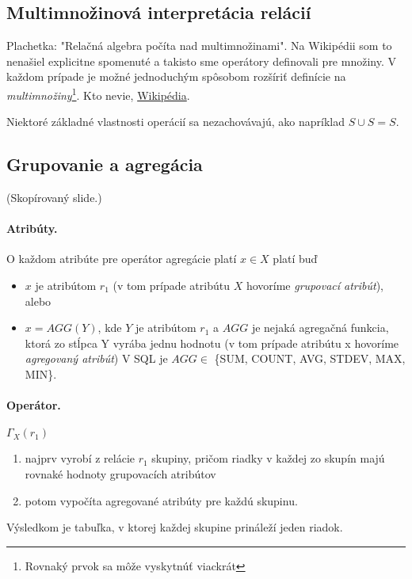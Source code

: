 \documentclass[10pt,a4paper]{article}
\begin{document}
\subsection{Multimnožinová interpretácia relácií}

Plachetka: "Relačná algebra počíta nad multimnožinami". Na Wikipédii som to nenašiel explicitne spomenuté a takisto sme operátory definovali pre množiny. V každom prípade je možné jednoduchým spôsobom rozšíriť definície na \emph{multimnožiny}\footnote{Rovnaký prvok sa môže vyskytnúť viackrát}. Kto nevie, \href{http://en.wikipedia.org/wiki/Multiset}{Wikipédia}. 

Niektoré základné vlastnosti operácií sa nezachovávajú, ako napríklad $S \cup S = S$. 

\subsection{Grupovanie a agregácia}
\label{rel_alg_agg}
(Skopírovaný slide.)

\paragraph{Atribúty.}
O každom atribúte pre operátor agregácie platí $x \in X$ platí buď 
\begin{itemize}
\item $x$ je atribútom $r_1$ (v tom prípade atribútu $X$ hovoríme
        \emph{grupovací atribút}), alebo
\item $x = AGG(Y)$, kde $Y$ je atribútom $r_1$ a $AGG$ je nejaká
     agregačná funkcia, ktorá zo stĺpca Y vyrába jednu hodnotu (v
         tom prípade atribútu x hovoríme \emph{agregovaný atribút})
V SQL je $AGG \in$ \{SUM, COUNT, AVG, STDEV, MAX, MIN\}.
\end{itemize}

\paragraph{Operátor.}
$\Gamma_X(r_1)$
\begin{enumerate}
\item najprv vyrobí z relácie $r_1$ skupiny, pričom riadky v každej zo
skupín majú rovnaké hodnoty grupovacích atribútov
\item potom vypočíta agregované atribúty pre každú skupinu.
\end{enumerate}
Výsledkom je tabuľka, v ktorej každej skupine prináleží jeden
riadok.
 
\end{document}
